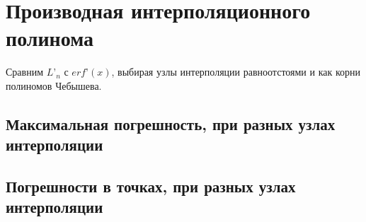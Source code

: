 \section{Производная интерполяционного полинома}
Сравним $L’_n$ с $erf’(x)$, выбирая узлы интерполяции равноотстоями и как корни полиномов Чебышева.

\subsection{Максимальная погрешность, при разных узлах интерполяции}


\subsection{Погрешности в точках, при разных узлах интерполяции}

